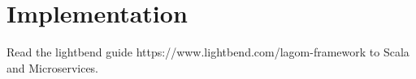 \section{Implementation} \label{sec:Implementation}

Read the lightbend guide https://www.lightbend.com/lagom-framework to Scala and Microservices.
